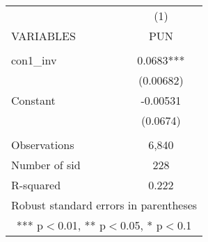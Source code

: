 \documentclass[]{article}
\begin{document}
\begin{tabular}{lc} \hline
 & (1) \\
VARIABLES & PUN \\ \hline
 &  \\
con1\_inv & 0.0683*** \\
 & (0.00682) \\
Constant & -0.00531 \\
 & (0.0674) \\
 &  \\
Observations & 6,840 \\
Number of sid & 228 \\
 R-squared & 0.222 \\ \hline
\multicolumn{2}{c}{ Robust standard errors in parentheses} \\
\multicolumn{2}{c}{ *** p$<$0.01, ** p$<$0.05, * p$<$0.1} \\
\end{tabular}
\end{document}
